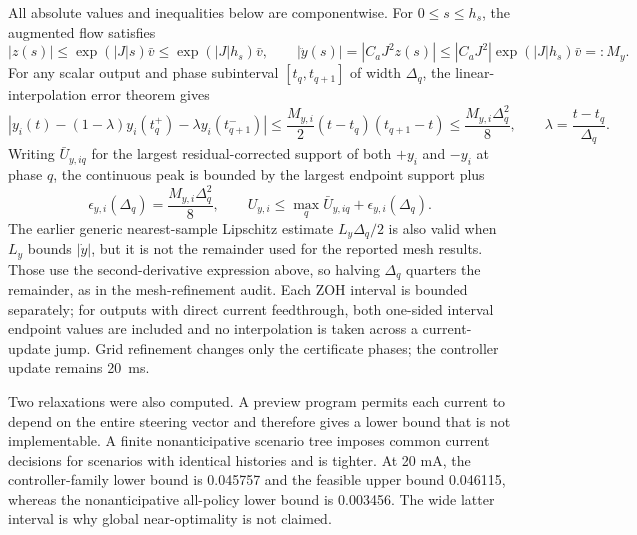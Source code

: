 \documentclass[10pt,a4paper]{article}
\begin{document}
All absolute values and inequalities below are componentwise. For $0\le s\le h_s$, the augmented flow satisfies
\begin{equation}
|z(s)|\le \exp(|J|s)\bar v\le \exp(|J|h_s)\bar v,
\qquad
|\ddot y(s)|=|C_aJ^2z(s)|\le |C_aJ^2|\exp(|J|h_s)\bar v=:M_y.
\label{eq:supp-second-derivative}
\end{equation}
For any scalar output and phase subinterval $[t_q,t_{q+1}]$ of width $\Delta_q$, the linear-interpolation error theorem gives
\begin{equation}
\left|y_i(t)-(1-\lambda)y_i(t_q^+)-\lambda y_i(t_{q+1}^-)\right|
\le \frac{M_{y,i}}{2}(t-t_q)(t_{q+1}-t)
\le \frac{M_{y,i}\Delta_q^2}{8},
\qquad \lambda=\frac{t-t_q}{\Delta_q}.
\end{equation}
Writing $\bar U_{y,iq}$ for the largest residual-corrected support of both $+y_i$ and $-y_i$ at phase $q$, the continuous peak is bounded by the largest endpoint support plus
\begin{equation}
\epsilon_{y,i}(\Delta_q)=\frac{M_{y,i}\Delta_q^2}{8},\qquad
U_{y,i}\le\max_q\bar U_{y,iq}+\epsilon_{y,i}(\Delta_q).
\end{equation}
The earlier generic nearest-sample Lipschitz estimate $L_y\Delta_q/2$ is also valid when $L_y$ bounds $|\dot y|$, but it is not the remainder used for the reported mesh results. Those use the second-derivative expression above, so halving $\Delta_q$ quarters the remainder, as in the mesh-refinement audit. Each ZOH interval is bounded separately; for outputs with direct current feedthrough, both one-sided interval endpoint values are included and no interpolation is taken across a current-update jump. Grid refinement changes only the certificate phases; the controller update remains \SI{20}{ms}.

Two relaxations were also computed. A preview program permits each current to depend on the entire steering vector and therefore gives a lower bound that is not implementable. A finite nonanticipative scenario tree imposes common current decisions for scenarios with identical histories and is tighter. At 20 mA, the controller-family lower bound is 0.045757 and the feasible upper bound 0.046115, whereas the nonanticipative all-policy lower bound is 0.003456. The wide latter interval is why global near-optimality is not claimed.
\end{document}
